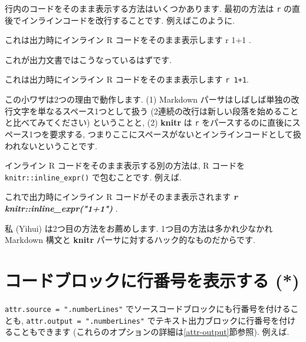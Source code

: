 \documentclass[
  11pt,
  lualatex,
  ja=standard]{bxjsreport}
\newenvironment{Shaded}{\begin{snugshade}}{\end{snugshade}}
\newcommand{\InformationTok}[1]{\textcolor[rgb]{0.56,0.35,0.01}{\textbf{\textit{#1}}}}
\newcommand{\NormalTok}[1]{#1}
\renewenvironment{quote}{\def\FrameCommand{{\color{quotebarcolor}{\vrule width 3pt}}\hspace{10pt}}\MakeFramed{\advance\hsize-\width\FrameRestore}}{\endMakeFramed}
\begin{document}
行内のコードをそのまま表示する方法はいくつかあります. 最初の方法は \texttt{\textasciigrave{}r} の直後でインラインコードを改行することです. 例えばこのように.

\begin{Shaded}
\begin{Highlighting}[]
\NormalTok{これは出力時にインライン R コードをそのまま表示します \textasciigrave{}}\InformationTok{\textasciigrave{} \textasciigrave{}}\NormalTok{r}
\NormalTok{1+1\textasciigrave{} \textasciigrave{}\textasciigrave{}.}
\end{Highlighting}
\end{Shaded}

これが出力文書ではこうなっているはずです.

\begin{quote}
これは出力時にインライン R コードをそのまま表示します \texttt{\textasciigrave{}r\ 1+1\textasciigrave{}}.
\end{quote}

この小ワザは2つの理由で動作します. (1) Markdown パーサはしばしば単独の改行文字を単なるスペース1つとして扱う (2連続の改行は新しい段落を始めることと比べてみてください) ということと, (2) \textbf{knitr} は \texttt{\textasciigrave{}r} をパースするのに直後にスペース1つを要求する, つまりここにスペースがないとインラインコードとして扱われないということです.

インライン R コードをそのまま表示する別の方法は, R コードを \texttt{knitr::inline\_expr()} で包むことです. 例えば.

\begin{Shaded}
\begin{Highlighting}[]
\NormalTok{これで出力時にインライン R コードがそのまま表示されます}
\InformationTok{\textasciigrave{}\textasciigrave{} \textasciigrave{}r knitr::inline\_expr("1+1")\textasciigrave{} \textasciigrave{}\textasciigrave{}}\NormalTok{.}
\end{Highlighting}
\end{Shaded}

私 (Yihui) は2つ目の方法をお薦めします. 1つ目の方法は多かれ少なかれ Markdown 構文と \textbf{knitr} パーサに対するハック的なものだからです.

\hypertarget{number-lines}{%
\section{コードブロックに行番号を表示する (*)}\label{number-lines}}

\texttt{attr.source = ".numberLines"} でソースコードブロックにも行番号を付けることも, \texttt{attr.output = ".numberLines"} でテキスト出力ブロックに行番号を付けることもできます (これらのオプションの詳細は\ref{attr-output}節参照). 例えば.
\end{document}
